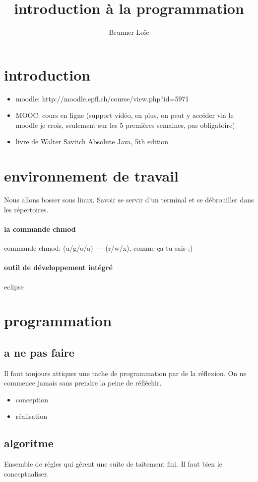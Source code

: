 \documentclass[a4paper,10pt]{article}
\title{introduction à la programmation}
\author{Brunner Loïc}
\begin{document}
\maketitle


\section{introduction}
\begin{itemize}
 \item moodle: http://moodle.epfl.ch/course/view.php?id=5971
 \item MOOC: cours en ligne (support vidéo, en plus, on peut y accéder via le moodle je crois, seulement sur les 5 premières semaines, pas obligatoire)
 \item livre de Walter Savitch Absolute Java, 5th edition
 \end{itemize}
 
 \section{environnement de travail}
 
 Nous allons bosser sous linux. Savoir se servir d'un terminal et se débrouiller dans les répertoires.
 \paragraph{la commande chmod}
 commande chmod: (u/g/o/a) +- (r/w/x), comme ça tu sais ;)
 \paragraph{outil de développement intégré}
 eclipse
 
 \section{programmation}
 \subsection{a ne pas faire}
 Il faut toujours attiquer une tache de programmation par de la réflexion. On ne commence jamais sans prendre la peine de réfléchir.
 \begin{itemize}
  \item conception
  \item réalisation
 \end{itemize}
 \subsection{algoritme}
 Ensemble de régles qui gèrent une suite de taitement fini. Il faut bien le conceptualiser.
\end{document}
